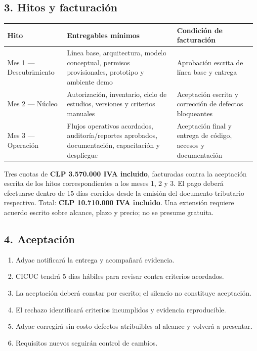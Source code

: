 \documentclass[
]{article}
\providecommand{\tightlist}{%
  \setlength{\itemsep}{0pt}\setlength{\parskip}{0pt}}
\begin{document}
\hypertarget{3-hitos-y-facturaciuxf3n}{%
\subsection{3. Hitos y facturación}\label{3-hitos-y-facturaciuxf3n}}

\begin{longtable}[]{@{}lll@{}}
\toprule\noalign{}
Hito & Entregables mínimos & Condición de facturación \\
\midrule\noalign{}
\endhead
\bottomrule\noalign{}
\endlastfoot
Mes 1 --- Descubrimiento & Línea base, arquitectura, modelo conceptual,
permisos provisionales, prototipo y ambiente demo & Aprobación escrita
de línea base y entrega \\
Mes 2 --- Núcleo & Autorización, inventario, ciclo de estudios,
versiones y criterios manuales & Aceptación escrita y corrección de
defectos bloqueantes \\
Mes 3 --- Operación & Flujos operativos acordados, auditoría/reportes
aprobados, documentación, capacitación y despliegue & Aceptación final y
entrega de código, accesos y documentación \\
\end{longtable}

Tres cuotas de \textbf{CLP 3.570.000 IVA incluido}, facturadas contra la
aceptación escrita de los hitos correspondientes a los meses 1, 2 y 3.
El pago deberá efectuarse dentro de 15 días corridos desde la emisión
del documento tributario respectivo. Total: \textbf{CLP 10.710.000 IVA
incluido}. Una extensión requiere acuerdo escrito sobre alcance, plazo y
precio; no se presume gratuita.

\hypertarget{4-aceptaciuxf3n}{%
\subsection{4. Aceptación}\label{4-aceptaciuxf3n}}

\begin{enumerate}
\def\labelenumi{\arabic{enumi}.}
\tightlist
\item
  Adyac notificará la entrega y acompañará evidencia.
\item
  CICUC tendrá 5 días hábiles para revisar contra criterios acordados.
\item
  La aceptación deberá constar por escrito; el silencio no constituye
  aceptación.
\item
  El rechazo identificará criterios incumplidos y evidencia
  reproducible.
\item
  Adyac corregirá sin costo defectos atribuibles al alcance y volverá a
  presentar.
\item
  Requisitos nuevos seguirán control de cambios.
\end{enumerate}
\end{document}
